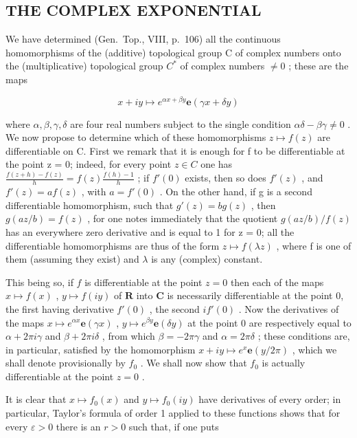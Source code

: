 \subsection{THE COMPLEX EXPONENTIAL}

We have determined (Gen.~Top., VIII, p.~106) all the continuous homomorphisms of the (additive) topological group C of complex numbers onto the (multiplicative) topological group \(C^{*}\) of complex numbers \(\neq 0\) ; these are the maps

\[
x + i y \mapsto e ^ {\alpha x + \beta y} \mathbf {e} (\gamma x + \delta y)\tag{20}
\]

where \(\alpha, \beta, \gamma, \delta\) are four real numbers subject to the single condition \(\alpha\delta - \beta\gamma \neq 0\) . We now propose to determine which of these homomorphisms \(z \mapsto f(z)\) are differentiable on C. First we remark that it is enough for f to be differentiable at the point z = 0; indeed, for every point \(z \in C\) one has \(\frac{f(z + h) - f(z)}{h} = f(z) \frac{f(h) - 1}{h}\) ; if \(f'(0)\) exists, then so does \(f'(z)\) , and \(f'(z) = af(z)\) , with \(a = f'(0)\) . On the other hand, if g is a second differentiable homomorphism, such that \(g'(z) = bg(z)\) , then \(g(az/b) = f(z)\) , for one notes immediately that the quotient \(g(az/b)/f(z)\) has an everywhere zero derivative and is equal to 1 for z = 0; all the differentiable homomorphisms are thus of the form \(z \mapsto f(\lambda z)\) , where f is one of them (assuming they exist) and \(\lambda\) is any (complex) constant.

This being so, if \(f\) is differentiable at the point \(z = 0\) then each of the maps \(x \mapsto f(x)\) , \(y \mapsto f(iy)\) of \(\mathbf{R}\) into \(\mathbf{C}\) is necessarily differentiable at the point 0, the first having derivative \(f'(0)\) , the second \(if'(0)\) . Now the derivatives of the maps \(x \mapsto e^{\alpha x}\mathbf{e}(\gamma x)\) , \(y \mapsto e^{\beta y}\mathbf{e}(\delta y)\) at the point 0 are respectively equal to \(\alpha + 2\pi i\gamma\) and \(\beta + 2\pi i\delta\) , from which \(\beta = -2\pi\gamma\) and \(\alpha = 2\pi\delta\) ; these conditions are, in particular, satisfied by the homomorphism \(x + iy \mapsto e^x\mathbf{e}(y/2\pi)\) , which we shall denote provisionally by \(f_0\) . We shall now show that \(f_0\) is actually differentiable at the point \(z = 0\) .

It is clear that \(x \mapsto f_0(x)\) and \(y \mapsto f_0(iy)\) have derivatives of every order; in particular, Taylor's formula of order 1 applied to these functions shows that for every \(\varepsilon > 0\) there is an \(r > 0\) such that, if one puts

